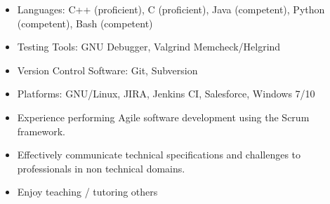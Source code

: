 \documentclass[10pt,letterpaper]{article}
\begin{document}
\begin{minipage}[t]{0.53\textwidth}
        \begin{flushleft}
                \begin{itemize}
                        \setlength\itemsep{-0.10em}
                        \item Languages: C++ (proficient), C (proficient), Java (competent), Python (competent), Bash (competent)
                        \item Testing Tools: GNU Debugger, Valgrind Memcheck/Helgrind
                        \item Version Control Software: Git, Subversion
                        \item Platforms: GNU/Linux, JIRA, Jenkins CI, Salesforce, Windows 7/10
                \end{itemize}
        \end{flushleft}
\end{minipage}
\begin{minipage}[t]{0.44\textwidth}
        \begin{flushright}
                \begin{flushleft}
                        \begin{itemize}
                                \setlength\itemsep{-0.10em}
                                \item Experience performing Agile software development using the Scrum framework.
                                \item Effectively communicate technical specifications
                                      and challenges to professionals in non technical domains.
                                \item Enjoy teaching / tutoring others
                        \end{itemize}
                \end{flushleft}
        \end{flushright}
\end{minipage}
\end{document}

